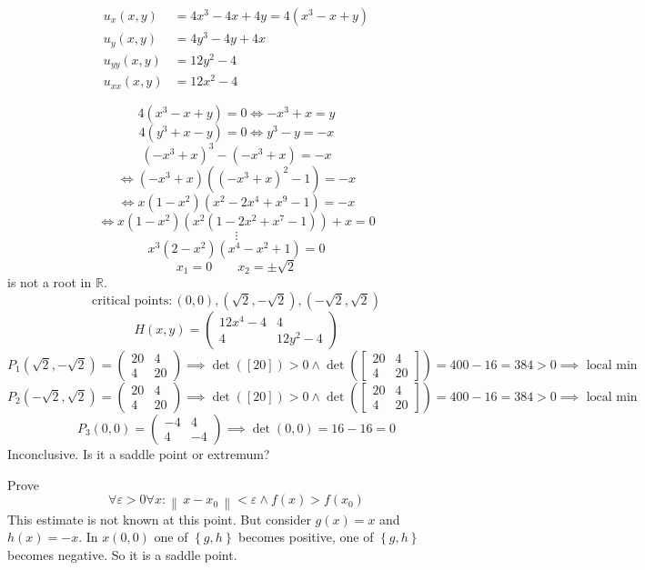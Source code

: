 \documentclass[a4paper]{article}
\theoremstyle{definition}
\newcommand\norm[1]{\left\|\,#1\,\right\|}
\newcommand\set[1]{\left\{#1\right\}}
\begin{document}
\begin{align*}
  u_x(x,y) &= 4x^3 - 4x + 4y = 4(x^3 - x + y) \\
  u_y(x,y) &= 4y^3 - 4y + 4x \\
  u_{yy}(x,y) &= 12y^2 - 4 \\
  u_{xx}(x,y) &= 12x^2 - 4
\end{align*}

\[ 4(x^3 - x + y) = 0 \iff -x^3 + x = y \]
\[ 4(y^3 + x - y) = 0 \iff y^3 - y = -x \]
\[ (-x^3 + x)^3 - (-x^3 + x) = -x \]
\[ \iff (-x^3 + x) ((-x^3 + x)^2 - 1) = -x \]
\[ \iff x (1 - x^2) (x^2 - 2x^4 + x^9 - 1) = -x \]
\[ \iff x (1 - x^2) (x^2 (1 - 2x^2 + x^7 - 1)) + x = 0 \]
\[ \vdots \]
\[ x^3 (2 - x^2) (x^4 - x^2 + 1) = 0 \]
\[ x_1 = 0 \qquad x_2 = \pm \sqrt{2} \]
is not a root in $\mathbb R$.
\[ \text{critical points}: (0, 0), (\sqrt{2}, -\sqrt{2}), (-\sqrt{2}, \sqrt{2}) \]
\[ H(x,y) = \begin{pmatrix} 12x^4 - 4 & 4 \\ 4 & 12y^2 - 4 \end{pmatrix} \]
\[ P_1(\sqrt2, -\sqrt2) = \begin{pmatrix} 20 & 4 \\ 4 & 20 \end{pmatrix} \implies \det([20]) > 0 \land \det\left(\begin{bmatrix} 20 & 4 \\ 4 & 20 \end{bmatrix}\right) = 400 - 16 = 384 > 0 \implies \text{ local min} \]
\[ P_2(-\sqrt2, \sqrt2) = \begin{pmatrix} 20 & 4 \\ 4 & 20 \end{pmatrix} \implies \det([20]) > 0 \land \det\left(\begin{bmatrix} 20 & 4 \\ 4 & 20 \end{bmatrix}\right) = 400 - 16 = 384 > 0 \implies \text{ local min} \]
\[ P_3(0, 0) = \begin{pmatrix} -4 & 4 \\ 4 & -4 \end{pmatrix} \implies \det(0,0) = 16 - 16 = 0 \]
Inconclusive. Is it a saddle point or extremum?

Prove
\[ \forall \varepsilon > 0 \forall x: \norm{x - x_0} < \varepsilon \land f(x) > f(x_0) \]
This estimate is not known at this point.
But consider $g(x) = x$ and $h(x) = -x$. In $x(0, 0)$ one of $\set{g,h}$ becomes positive, one of $\set{g,h}$ becomes negative.
So it is a saddle point.
\end{document}

